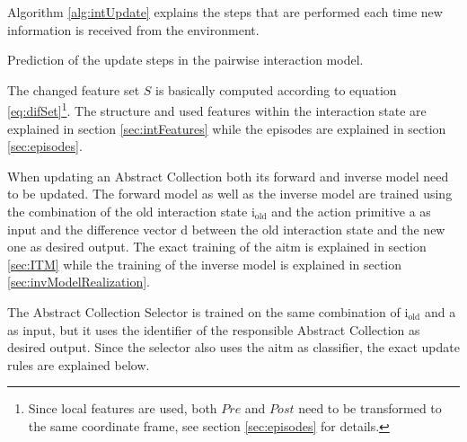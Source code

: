 Algorithm \ref{alg:intUpdate} explains the steps that are performed each time new information is received from the environment.

\begin{algorithm}
	\BlankLine
	\caption{Prediction of the update steps in the pairwise interaction model.}
	\label{alg:intUpdate}
\end{algorithm}

The changed feature set $S$ is basically computed according to equation \ref{eq:difSet}\footnote{Since local features are used, both $Pre$ and $Post$ need to be transformed to the same coordinate frame, see section \ref{sec:episodes} for details.}. The structure and used features within the interaction state are explained in section \ref{sec:intFeatures} while the episodes are explained in section \ref{sec:episodes}.

When updating an Abstract Collection both its forward and inverse model need to be updated. The forward model as well as the inverse model are trained using the combination of the old interaction state i$_\text{old}$ and the action primitive a as input and the difference vector d between the old interaction state and the new one as desired output. The exact training of the \gls{aitm} is explained in section \ref{sec:ITM} while the training of the inverse model is explained in section \ref{sec:invModelRealization}.

The Abstract Collection Selector is trained on the same combination of i$_\text{old}$ and a as input, but it uses the identifier of the responsible Abstract Collection as desired output.
Since the selector also uses the \gls{aitm} as classifier, the exact update rules are explained below.

